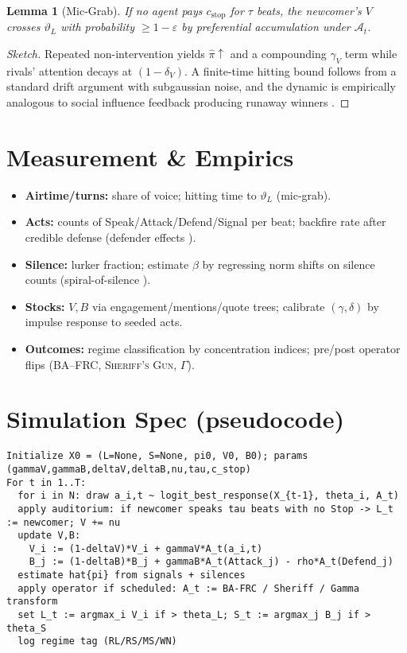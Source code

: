 \documentclass[11pt]{article}
\newtheorem{lemma}{Lemma}
\theoremstyle{definition}
\newcommand{\Spectacle}{\mathcal{A}}
\newcommand{\BAFRC}{\textsc{BA--FRC}} %
\newcommand{\Sheriff}{\textsc{Sheriff's Gun}}
\begin{document}
\begin{lemma}[Mic\hyp Grab]
If no agent pays $c_{\text{stop}}$ for $\tau$ beats, the newcomer’s $V$ crosses $\vartheta_L$ with probability $\ge 1-\varepsilon$ by preferential accumulation under $\Spectacle_t$.
\end{lemma}
\begin{proof}[Sketch]
Repeated non\hyp intervention yields $\hat\pi\uparrow$ and a compounding $\gamma_V$ term while rivals’ attention decays at $(1-\delta_V)$. A finite\hyp time hitting bound follows from a standard drift argument with subgaussian noise, and the dynamic is empirically analogous to social influence feedback producing runaway winners \citep{salganik2006}.
\end{proof}

\section{Measurement \& Empirics}
\begin{itemize}[leftmargin=2em]
\item \textbf{Airtime/turns:} share of voice; hitting time to $\vartheta_L$ (mic\hyp grab).
\item \textbf{Acts:} counts of Speak/Attack/Defend/Signal per beat; backfire rate after credible defense (defender effects \citealp{salmivalli2010,huitsing2014}).
\item \textbf{Silence:} lurker fraction; estimate $\beta$ by regressing norm shifts on silence counts (spiral\hyp of\hyp silence \citealp{noelleneumann1974}).
\item \textbf{Stocks:} $V,B$ via engagement/mentions/quote trees; calibrate $(\gamma,\delta)$ by impulse response to seeded acts.
\item \textbf{Outcomes:} regime classification by concentration indices; pre/post operator flips (\BAFRC{}, \Sheriff{}, $\Gamma$).
\end{itemize}

\section{Simulation Spec (pseudocode)}
\begin{lstlisting}
Initialize X0 = (L=None, S=None, pi0, V0, B0); params (gammaV,gammaB,deltaV,deltaB,nu,tau,c_stop)
For t in 1..T:
  for i in N: draw a_i,t ~ logit_best_response(X_{t-1}, theta_i, A_t)
  apply auditorium: if newcomer speaks tau beats with no Stop -> L_t := newcomer; V += nu
  update V,B:
    V_i := (1-deltaV)*V_i + gammaV*A_t(a_i,t)
    B_j := (1-deltaB)*B_j + gammaB*A_t(Attack_j) - rho*A_t(Defend_j)
  estimate hat{pi} from signals + silences
  apply operator if scheduled: A_t := BA-FRC / Sheriff / Gamma transform
  set L_t := argmax_i V_i if > theta_L; S_t := argmax_j B_j if > theta_S
  log regime tag (RL/RS/MS/WN)
\end{lstlisting}
\end{document}
